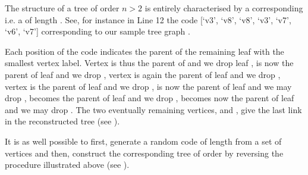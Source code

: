 \documentclass[a4paper,12pt,english]{sphinxhowto}
\begin{document}
The structure of a tree of order \(n > 2\) is entirely characterised by a corresponding   \sphinxhyphen{}i.e. a \sphinxhyphen{} of length . See, for instance in Line 12 the code {[}‘v3’, ‘v8’, ‘v8’, ‘v3’, ‘v7’, ‘v6’, ‘v7’{]} corresponding to our sample tree graph .

Each position of the code indicates the parent of the remaining leaf with the smallest vertex label. Vertex  is thus the parent of  and we drop leaf ,  is now the parent of leaf  and we drop , vertex  is again the parent of leaf  and we drop , vertex  is the parent of leaf  and we drop ,  is now the parent of leaf  and we may drop ,  becomes the parent of leaf  and we drop ,  becomes now the parent of leaf  and we may drop . The two eventually remaining vertices,  and , give the last link in the reconstructed tree (see ).

It is as well possible to first, generate a random  code of length  from a set of  vertices and then, construct the corresponding tree of order  by reversing the procedure illustrated above (see ).
\end{document}
